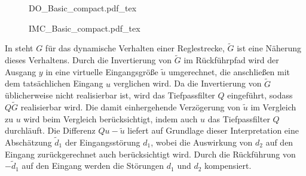 


\begin{figure}[htp!]

\begin{minipage}[t]{0.5\textwidth}
\centering
{DO_Basic_compact.pdf_tex}
\parbox{0.9\textwidth}{\label{fig:DO_Basic}}
\end{minipage}
\begin{minipage}[t]{0.5\textwidth}
\centering
{IMC_Basic_compact.pdf_tex}
\parbox{0.8\textwidth}{\label{fig:IMC_Basic}}
\end{minipage}

\end{figure}



In  steht $G$ für das dynamische Verhalten einer Reglestrecke, $\tilde G$ ist eine Näherung dieses Verhaltens. Durch die Invertierung von $\tilde G$ im Rückführpfad wird der Ausgang $y$ in eine virtuelle Eingangsgröße $\tilde u$ umgerechnet, die anschließen mit dem tatsächlichen Eingang $u$ verglichen wird. Da die Invertierung von $\tilde G$ üblicherweise nicht realisierbar ist, wird das Tiefpassfilter $Q$ eingeführt, sodass $Q\tilde G$ realisierbar wird. Die damit einhergehende Verzögerung von $\tilde u$ im Vergleich zu $u$ wird beim Vergleich berücksichtigt, indem auch $u$ das Tiefpassfilter $Q$ durchläuft. Die Differenz $Qu-\tilde u$ liefert auf Grundlage dieser Interpretation eine Abschätzung $\tilde d_1$ der Eingangsstörung $d_1$, wobei die Auswirkung von $d_2$ auf den Eingang zurückgerechnet auch berücksichtigt wird. Durch die Rückführung von $-\tilde d_1$ auf den Eingang werden die Störungen $d_1$ und $d_2$ kompensiert.



